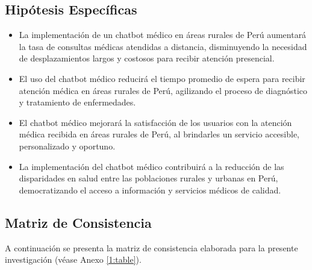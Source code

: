 \subsection{Hipótesis Específicas}
\newcommand{\Hone}{
La implementación de un chatbot médico en áreas rurales de Perú aumentará la tasa de consultas médicas atendidas a distancia, disminuyendo la necesidad de desplazamientos largos y costosos para recibir atención presencial.
}
\newcommand{\Htwo}{
El uso del chatbot médico reducirá el tiempo promedio de espera para recibir atención médica en áreas rurales de Perú, agilizando el proceso de diagnóstico y tratamiento de enfermedades.
}
\newcommand{\Hthree}{
El chatbot médico mejorará la satisfacción de los usuarios con la atención médica recibida en áreas rurales de Perú, al brindarles un servicio accesible, personalizado y oportuno.
}
\newcommand{\Hfour}{
La implementación del chatbot médico contribuirá a la reducción de las disparidades en salud entre las poblaciones rurales y urbanas en Perú, democratizando el acceso a información y servicios médicos de calidad.
}
\begin{itemize}
	\item \Hone
	\item \Htwo
	\item \Hthree
	\item \Hfour

\end{itemize}

\subsection{Matriz de Consistencia}
A continuación se presenta la matriz de consistencia elaborada para la presente investigación (véase Anexo \ref{1:table}).


